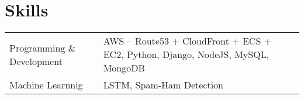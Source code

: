 \documentclass[a4paper,12pt]{article}
\begin{document}
\section{Skills}
\begin{tabularx}{\linewidth}{@{}l X@{}}
Programming \& Development &  \normalsize{AWS -- Route53 + CloudFront + ECS + EC2, Python, Django, NodeJS, MySQL, MongoDB}\\
Machine Learnnig &  \normalsize{LSTM, Spam-Ham Detection}\\  
\end{tabularx}

\vfill
\end{document}
